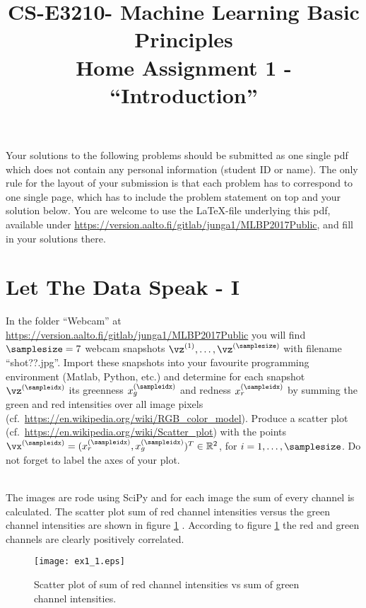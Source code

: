 \documentclass[article,11pt]{article}
\title{CS-E3210- Machine Learning Basic Principles \\ Home Assignment 1 - ``Introduction''}
\begin{document}
\date{}
\maketitle

Your solutions to the following problems should be submitted as one single pdf which does not contain 
any personal information (student ID or name). The only rule for the layout of your submission is that 
each problem has to correspond to one single page, which has to include the problem statement on top 
and your solution below. You are welcome to use the \LaTeX-file underlying this pdf, 
available under \url{https://version.aalto.fi/gitlab/junga1/MLBP2017Public}, and fill in your solutions there. 

\newpage

\section{Let The Data Speak - I}
In the folder ``Webcam'' at \url{https://version.aalto.fi/gitlab/junga1/MLBP2017Public} you will find $\samplesize=7$  
webcam snapshots $\vz^{(1)},\ldots,\vz^{(\samplesize)}$ with filename ``shot??.jpg''. Import these snapshots into your favourite 
programming environment (Matlab, Python, etc.) and determine for each snapshot $\vz^{(\sampleidx)}$ its greenness $x_{g}^{(\sampleidx)}$ 
and redness $x_{r}^{(\sampleidx)}$ by summing the green and red intensities over all image pixels (cf.\ \url{https://en.wikipedia.org/wiki/RGB_color_model}). 
Produce a scatter plot (cf.\ \url{https://en.wikipedia.org/wiki/Scatter_plot}) with the points $\vx^{(\sampleidx)}=(x^{(\sampleidx)}_{r},x^{(\sampleidx)}_{g})^{T} \in \mathbb{R}^{2}$, for $i=1,\ldots,\samplesize$. 
Do not forget to label the axes of your plot. 

\\The images are rode using SciPy and for each image the sum of every channel is calculated. The scatter plot sum of red channel intensities versus the green channel intensities are shown in figure \ref{fig:scatter_plot1} . According to figure \ref{fig:scatter_plot1} the red and green channels are clearly positively correlated.
\begin{figure}[!b]
  \centering
  \texttt{[image: ex1\_1.eps]}
  \caption{Scatter plot of sum of red channel intensities vs sum of green channel intensities.}
  \label{fig:scatter_plot1}
\end{figure}
\end{document}
